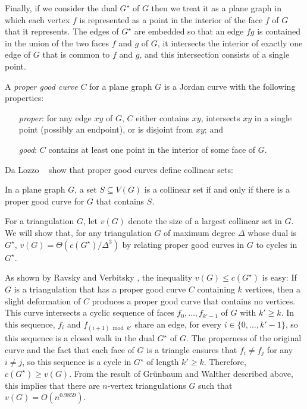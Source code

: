 \documentclass{patmorin}
\newcommand{\dual}[1]{{#1}^\star}
\begin{document}
Finally, if we consider the dual $\dual{G}$ of $G$ then we treat it
as a plane graph in which each vertex $f$ is represented as a point in
the interior of the face $f$ of $G$ that it represents.  The edges of
$\dual{G}$ are embedded so that an edge $fg$ is contained in the union of
the two faces $f$ and $g$ of $G$, it intersects the interior of exactly
one edge of $G$ that is common to $f$ and $g$, and this intersection
consists of a single point.

A \emph{proper good curve} $C$ for a plane graph $G$ is a
Jordan curve with the following properties:
\begin{enumerate}
	\item[\emph{proper}:] for any edge $xy$ of $G$, $C$ either contains $xy$, intersects
  $xy$ in a single point (possibly an endpoint), or is disjoint
  from $xy$; and
  \item[\emph{good}:] $C$ contains at least one point in the interior of
  some face of $G$.
\end{enumerate}

Da Lozzo \etal\ \cite{dalozzo.dujmovic.ea:drawing} show that proper good
curves define collinear sets:

\begin{thm}
  In a plane graph $G$, a set $S\subseteq V(G)$ is a collinear set if
  and only if there is a proper good curve for $G$ that contains $S$.
\end{thm}

For a triangulation $G$, let $v(G)$ denote the size of a largest
collinear set in $G$.  We will show that, for any triangulation $G$
of maximum degree $\Delta$
whose dual is $\dual{G}$, $v(G)=\Theta(c(\dual{G})/\Delta^3)$ by relating proper good curves in $G$ to cycles in $\dual{G}$.

As shown by Ravsky and Verbitsky
\cite{ravsky.verbitsky:on,ravsky.verbitsky:on-arxiv}, the inequality $v(G)
\le c(\dual{G})$ is easy: If $G$ is a triangulation that has a proper
good curve $C$ containing $k$ vertices, then a slight deformation of
$C$ produces a proper good curve that contains no vertices. This curve
intersects a cyclic sequence of faces $f_0,\ldots,f_{k'-1}$ of $G$
with $k'\ge k$.  In this sequence, $f_i$ and $f_{(i+1)\bmod k'}$ share
an edge, for every $i\in\{0,\ldots,k'-1\}$, so this sequence is a closed
walk in the dual $\dual{G}$ of $G$.  The properness of the original curve
and the fact that each face of $G$ is a triangle ensures that $f_i\neq
f_j$ for any $i\neq j$, so this sequence is a cycle in $\dual{G}$ of
length $k'\ge k$.  Therefore, $c(\dual{G})\ge v(G)$. From the result
of Gr\"unbaum and Walther described above, this implies that there are
$n$-vertex triangulations $G$ such that $v(G) = O(n^{0.9859})$.
\end{document}
